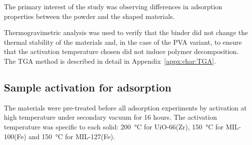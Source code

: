 The primary interest of the study was observing differences 
in adsorption properties between the powder and the shaped materials.

Thermogravimetric analysis was used to verify that the binder 
did not change the thermal stability of the materials and, in the 
case of the PVA variant, to ensure that the activation temperature
chosen did not induce polymer decomposition. The TGA method is described 
in detail in Appendix~\ref{appx:char:TGA}.



\subsection{Sample activation for adsorption}

The materials were pre-treated before all adsorption experiments by activation at high 
temperature under secondary vacuum for 16 hours. The activation temperature was specific
to each solid: \SI{200}{\degreeCelsius} for UiO-66(Zr), \SI{150}{\degreeCelsius}
for MIL-100(Fe) and \SI{150}{\degreeCelsius} for MIL-127(Fe).

